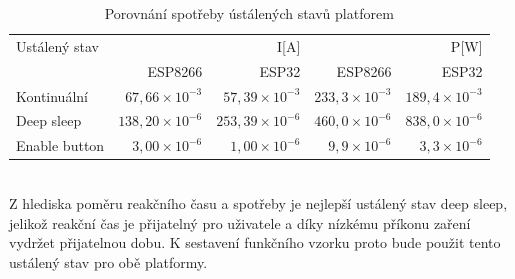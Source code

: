 \documentclass[a4paper, 12pt]{report}
\begin{document}
    \begin{table}[h!]
        \centering
        \caption{Porovnání spotřeby ústálených stavů platforem}
        \begin{tabular}{||l|r r|r r||}
            \hline
            Ustálený stav & \multicolumn{2}{C|}{I[A]} & \multicolumn{2}{C||}{P[W]}   \\
                          & ESP8266        & ESP32   & ESP8266 & ESP32 \\
            \hline
            Kontinuální   & $67,66 \times 10^{-3}$   & $57,39 \times 10^{-3}$ & $233,3 \times 10^{-3}$& $189,4 \times 10^{-3}$ \\
            Deep sleep       & $138,20 \times 10^{-6}$ & $253,39 \times 10^{-6}$ & $460,0 \times 10^{-6}$&$838,0 \times 10^{-6}$\\
            Enable button    &  $3,00 \times 10^{-6}$   & $1,00 \times 10^{-6}$ & $9,9 \times 10^{-6}$&$3,3 \times 10^{-6}$\\
            \hline
        \end{tabular}
        \label{tab:porovnani-klidove-rezimy-spotreba}
    \end{table}\\
    Z hlediska poměru reakčního času a spotřeby je nejlepší ustálený stav deep sleep, jelikož reakční čas je přijatelný pro uživatele a díky nízkému příkonu zaření vydržet přijatelnou dobu. K sestavení funkčního vzorku proto bude použit tento ustálený stav pro obě platformy.
\end{document}
